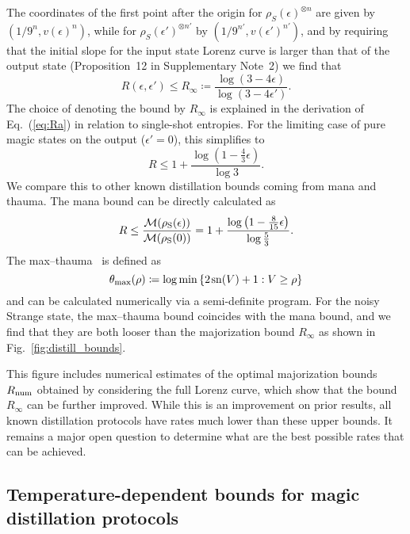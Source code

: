 \documentclass[
onecolumn,
superscriptaddress
]{revtex4-1}
\newcommand{\revhigh}[1]{{\color{red}#1}}
\def\M{{\cal M}}
\begin{document}
The coordinates of the first point after the origin for $\rho_S(\epsilon)^{\otimes n}$ are given by $(1/9^n, v(\epsilon)^n)$, while for $\rho_S(\epsilon')^{\otimes n'}$ by $(1/9^{n'}, v(\epsilon')^{n'})$, and by requiring that the initial slope for the input state Lorenz curve is larger than that of the output state (Proposition~12 in Supplementary Note~2) we find that
\begin{equation}\label{eq:unital-bound}
	R(\epsilon, \epsilon') \leq R_\infty \coloneqq\frac{\log (3-4\epsilon)}{\log (3-4\epsilon')}.
\end{equation}
The choice of denoting the bound by $R_\infty$ is explained in the derivation of Eq.~(\ref{eq:Ra}) in relation to single-shot entropies. For the limiting case of pure magic states on the output ($\epsilon'=0$), this simplifies to
\begin{equation}
	R \leq 1 + \frac{\log (1 - \frac{4}{3} \epsilon)}{\log 3}.
\end{equation}
We compare this to other known distillation bounds coming from mana and thauma. The mana bound can be directly calculated as
\begin{equation}
	R \leq \frac{\M(\rho_{\rm{S}}(\epsilon))}{\M(\rho_{\rm{S}}(0))} = 1 + \frac{\log \left(1 - \frac{8}{15}\epsilon \right)}{\log \frac{5}{3}}.
\end{equation}
The max--thauma~\cite{Wang_2020} is defined as
\begin{equation}
	\theta_{\rm{max}}(\rho) \coloneqq \log \min{\{2\hspace{1pt}{\rm sn}(V)+1 : V \geq \rho\}}
\end{equation}
and can be calculated numerically via a semi-definite program. For the noisy Strange state, the max--thauma bound coincides with the mana bound, and we find that they are both looser than the majorization bound $R_\infty$ as shown in Fig.~\ref{fig:distill_bounds}. 

This figure includes numerical estimates of the optimal majorization bounds $R_{\rm{num}}$ obtained by considering the full Lorenz curve, which show that the bound $R_\infty$ can be further improved. \revhigh{While this is an improvement on prior results,  all known distillation protocols have rates much lower than these upper bounds.  It remains a major open question to determine what are the best possible rates that can be achieved.}

\subsection*{Temperature-dependent bounds for magic distillation protocols}
\end{document}
